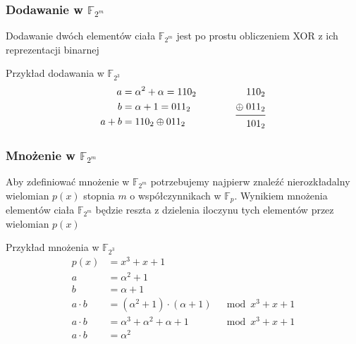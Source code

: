 \documentclass{beamer}
\begin{document}
\begin{frame}
	\frametitle{Dodawanie w $\mathbb{F}_{2^m}$}
	Dodawanie dwóch elementów ciała $\mathbb{F}_{2^m}$ jest po prostu obliczeniem XOR z ich reprezentacji binarnej

	\begin{exampleblock}{Przykład dodawania w $\mathbb{F}_{2^3}$}
		\begin{equation*}
			\begin{aligned}[t]
				a &= \alpha^2 + \alpha = 110_2 \\
				b &= \alpha + 1 = 011_2 \\
				a + b &= 110_2 \oplus 011_2
			\end{aligned}
			\qquad\qquad
			\begin{aligned}[t]
				&110_2 \\
				\oplus \; &011_2 \\
				\midrule
				&101_2
			\end{aligned}
		\end{equation*}
	\end{exampleblock}
\end{frame}

\begin{frame}
	\frametitle{Mnożenie w $\mathbb{F}_{2^m}$}
	Aby zdefiniować mnożenie w $\mathbb{F}_{2^m}$ potrzebujemy najpierw znaleźć
	nierozkładalny wielomian $p(x)$ stopnia	$m$ o współczynnikach w $\mathbb{F}_p$.
	Wynikiem mnożenia elementów ciała $\mathbb{F}_{2^m}$ będzie reszta z dzielenia
	iloczynu tych elementów przez wielomian $p(x)$

	\begin{exampleblock}{Przykład mnożenia w $\mathbb{F}_{2^3}$}
		\begin{align*}
			p(x) &= x^3 + x + 1 \\
			a &= \alpha^2 + 1 \\
			b &= \alpha + 1 \\
			a \cdot b &= (\alpha^2 + 1) \cdot(\alpha + 1) &\mod x^3 + x + 1 \\
			a \cdot b &= \alpha^3 + \alpha^2 + \alpha + 1 &\mod x^3 + x + 1 \\
			a \cdot b &= \alpha^2
		\end{align*}
	\end{exampleblock}
\end{frame}
\end{document}
